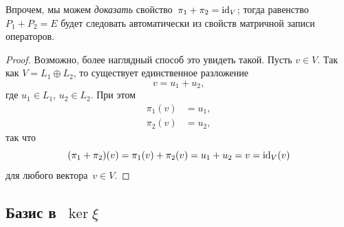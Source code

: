 \begin{solution}
	\begin{remark}
		Впрочем, мы можем \emph{доказать} свойство~$\pi_1 + \pi_2 = \mathop{\mathrm{id}}\nolimits_V$; тогда равенство~$P_1 + P_2 = E$ будет следовать автоматически из свойств матричной записи операторов.
	\end{remark}
	\begin{proof}
		Возможно, более наглядный способ это увидеть такой.
		Пусть $v \in V$. Так как $V = L_1 \oplus L_2$, то существует единственное разложение
		\[
			v = u_1 + u_2,
		\]
		где $u_1 \in L_1$, $u_2 \in L_2$. При этом
		\begin{align*}
			\pi_1(v) &= u_1,
			\\
			\pi_2(v) &= u_2,
		\end{align*}
		так что
		\[
			(\pi_1 + \pi_2)(v) =
			\pi_1(v) + \pi_2(v) =
			u_1 + u_2 = v =
			\mathop{\mathrm{id}}\nolimits_V (v)
		\]
		для любого вектора~$v \in V$. 
	\end{proof}


	\subsection[Базис в~$\ker{\xi}$]{Базис в~$\ker{\xi}$}


\end{solution}
